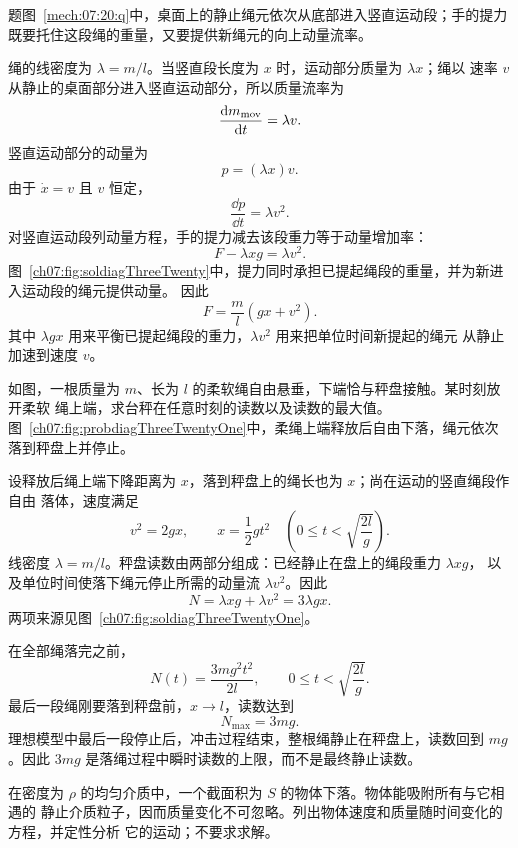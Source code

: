 {\begin{xesolution}题图~\ref{mech:07:20:q}中，桌面上的静止绳元依次从底部进入竖直运动段；手的提力既要托住这段绳的重量，又要提供新绳元的向上动量流率。

绳的线密度为 $\lambda=m/l$。当竖直段长度为 $x$ 时，运动部分质量为 $\lambda x$；绳以
速率 $v$ 从静止的桌面部分进入竖直运动部分，所以质量流率为
\[
 \frac{\mathop{}\!\mathrm d m_{\rm mov}}{\mathop{}\!\mathrm d t}=\lambda v.
\]
竖直运动部分的动量为
\[
 p=(\lambda x)v.
\]
由于 $\dot x=v$ 且 $v$ 恒定，
\[
 \frac{\dd p}{\dd t}=\lambda v^2.
\]
对竖直运动段列动量方程，手的提力减去该段重力等于动量增加率：
\[
 F-\lambda xg=\lambda v^2.
\]
图~\ref{ch07:fig:soldiagThreeTwenty}中，提力同时承担已提起绳段的重量，并为新进入运动段的绳元提供动量。
\soldiagThreeTwenty
因此
\[
 \boxed{F=\frac{m}{l}(gx+v^2)}.
\]
其中 $\lambda gx$ 用来平衡已提起绳段的重力，$\lambda v^2$ 用来把单位时间新提起的绳元
从静止加速到速度 $v$。
\end{xesolution}

\begin{origexamplebox}{}\label{ch07:ex:s08-3-21}
如图，一根质量为 $m$、长为 $l$ 的柔软绳自由悬垂，下端恰与秤盘接触。某时刻放开柔软
绳上端，求台秤在任意时刻的读数以及读数的最大值。
图~\ref{ch07:fig:probdiagThreeTwentyOne}中，柔绳上端释放后自由下落，绳元依次落到秤盘上并停止。
\probdiagThreeTwentyOne
\end{origexamplebox}

\begin{xesolution}
设释放后绳上端下降距离为 $x$，落到秤盘上的绳长也为 $x$；尚在运动的竖直绳段作自由
落体，速度满足
\[
 v^2=2gx,
 \qquad
 x=\frac12gt^2
 \quad\left(0\le t<\sqrt{\frac{2l}{g}}\right).
\]
线密度 $\lambda=m/l$。秤盘读数由两部分组成：已经静止在盘上的绳段重力 $\lambda xg$，
以及单位时间使落下绳元停止所需的动量流 $\lambda v^2$。因此
\[
 N=\lambda xg+\lambda v^2
 =3\lambda gx.
\]
两项来源见图~\ref{ch07:fig:soldiagThreeTwentyOne}。

\soldiagThreeTwentyOne
在全部绳落完之前，
\[
 \boxed{N(t)=\frac{3mg^2t^2}{2l}},
 \qquad
 0\le t<\sqrt{\frac{2l}{g}}.
\]
最后一段绳刚要落到秤盘前，$x\to l$，读数达到
\[
 \boxed{N_{\max}=3mg}.
\]
理想模型中最后一段停止后，冲击过程结束，整根绳静止在秤盘上，读数回到 $mg$。因此
$3mg$ 是落绳过程中瞬时读数的上限，而不是最终静止读数。
\end{xesolution}

\begin{origexamplebox}{}\label{ch07:ex:s08-3-22}
在密度为 $\rho$ 的均匀介质中，一个截面积为 $S$ 的物体下落。物体能吸附所有与它相遇的
静止介质粒子，因而质量变化不可忽略。列出物体速度和质量随时间变化的方程，并定性分析
它的运动；不要求求解。


\end{origexamplebox}}
